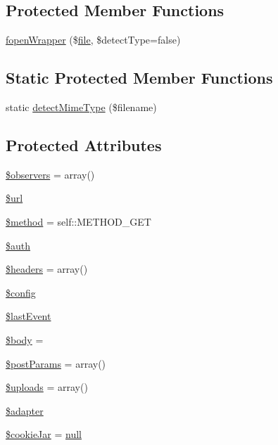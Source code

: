 \subsection*{Protected Member Functions}
\begin{DoxyCompactItemize}
\item 
\hyperlink{classHTTP__Request2_a1d4b42d63213562467f393e34c7a76dc}{fopen\+Wrapper} (\$\hyperlink{classfile}{file}, \$detect\+Type=false)
\end{DoxyCompactItemize}
\subsection*{Static Protected Member Functions}
\begin{DoxyCompactItemize}
\item 
static \hyperlink{classHTTP__Request2_ac1b8f0776d5faf41503d440350c8b6d6}{detect\+Mime\+Type} (\$filename)
\end{DoxyCompactItemize}
\subsection*{Protected Attributes}
\begin{DoxyCompactItemize}
\item 
\hyperlink{classHTTP__Request2_ab57c87d4bee6cb35be6b976a8ec7ec2f}{\$observers} = array()
\item 
\hyperlink{classHTTP__Request2_acf16b4d76ebd04a80dc8e140303ad895}{\$url}
\item 
\hyperlink{classHTTP__Request2_ae83c79d14f1b596d91b60862ea1370af}{\$method} = self\+::\+M\+E\+T\+H\+O\+D\+\_\+\+G\+ET
\item 
\hyperlink{classHTTP__Request2_a4c1219356a8c669730a1fe09bd8f81b1}{\$auth}
\item 
\hyperlink{classHTTP__Request2_a0d70f1b39d77f1e8bca7cd984d25192e}{\$headers} = array()
\item 
\hyperlink{classHTTP__Request2_a4043f1c6f00d8b92d2b3dcb5ecd2861e}{\$config}
\item 
\hyperlink{classHTTP__Request2_a53a051d2cfcad3fc688b7974c996e750}{\$last\+Event}
\item 
\hyperlink{classHTTP__Request2_af7de92496442c98589954db8327f9faf}{\$body} = \textquotesingle{}\textquotesingle{}
\item 
\hyperlink{classHTTP__Request2_a77aa571439401e1cd2adc407f4bdc222}{\$post\+Params} = array()
\item 
\hyperlink{classHTTP__Request2_ad95bfff299ff890d4f554754428337e5}{\$uploads} = array()
\item 
\hyperlink{classHTTP__Request2_a4de3f606051b53b314179271f9bd0173}{\$adapter}
\item 
\hyperlink{classHTTP__Request2_a1a4f35074ef955bfe726e85b76ed17a9}{\$cookie\+Jar} = \hyperlink{modernizr_8min_8js_a286f9ec831c5e676eeb493248eab9575}{null}
\end{DoxyCompactItemize}


